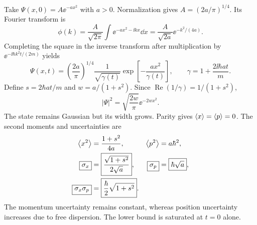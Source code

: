 Take $\Psi(x,0)=A\ee^{-ax^2}$ with $a>0$.
Normalization gives $A=(2a/\pi)^{1/4}$.
Its Fourier transform is
\begin{equation}
\phi(k)=\frac{A}{\sqrt{2\pi}}
\int\ee^{-ax^2-\ii kx}\dd x
=\frac{A}{\sqrt{2a}}\ee^{-k^2/(4a)}.
\end{equation}
Completing the square in the inverse transform after
multiplication by $\ee^{-\ii\hbar k^2t/(2m)}$ yields
\begin{equation}
\boxed{\Psi(x,t)=
\left(\frac{2a}{\pi}\right)^{1/4}
\frac1{\sqrt{\gamma(t)}}
\exp\left[-\frac{ax^2}{\gamma(t)}\right]},
\qquad \gamma=1+\frac{2\ii\hbar at}{m}.
\end{equation}
Define $s=2\hbar at/m$ and
$w=a/(1+s^2)$. Since
$\operatorname{Re}(1/\gamma)=1/(1+s^2)$,
\begin{equation}
\boxed{|\Psi|^2=\sqrt{\frac{2w}{\pi}}
\ee^{-2wx^2}}.
\end{equation}
The state remains Gaussian but its width grows.
Parity gives $\left\langle x\right\rangle=\left\langle p\right\rangle=0$.
The second moments and uncertainties are
\begin{align}
\left\langle x^2\right\rangle&=\frac{1+s^2}{4a},&
\left\langle p^2\right\rangle&=a\hbar^2,\\
\boxed{\sigma_x}&=\boxed{\frac{\sqrt{1+s^2}}{2\sqrt a}},&
\boxed{\sigma_p}&=\boxed{\hbar\sqrt a},\\
\boxed{\sigma_x\sigma_p}&=\boxed{\frac{\hbar}{2}\sqrt{1+s^2}}.
\end{align}
The momentum uncertainty remains constant, whereas
position uncertainty increases due to free dispersion.
The lower bound is saturated at $t=0$ alone.
